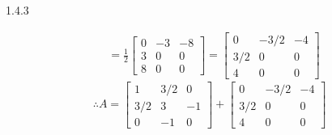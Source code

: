 \documentclass{article}
\theoremstyle{definition}
\begin{document}
\begin{prob}{1.4.3}
\begin{enumerate}[label=(\alph*)]
\begin{align*}
					&= \frac{1}{2} \begin{bmatrix} 0 & -3 & -8 \\ 3 & 0 & 0 \\ 8 & 0 & 0 \end{bmatrix} = \begin{bmatrix} 0 & -3/2 & -4 \\ 3/2 & 0 & 0 \\ 4 & 0 & 0 \end{bmatrix}
				\end{align*}
				$$ \therefore \boxed{ A = \begin{bmatrix} 1 & 3/2 & 0 \\ 3/2 & 3 & -1 \\ 0 & -1 & 0 \end{bmatrix} + \begin{bmatrix} 0 & -3/2 & -4 \\ 3/2 & 0 & 0 \\ 4 & 0 & 0 \end{bmatrix} } $$
				

\end{enumerate}
\end{prob}
\end{document}
